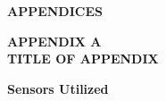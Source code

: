 \newpage


\begin{center}
    \vspace*{\fill}
    \large{\bf APPENDICES}
    \vspace*{\fill}
\end{center}

\newpage

\begin{center}
    \uppercase{\large{\bf APPENDIX A\\
    TITLE OF APPENDIX}}
\end{center}


\textbf{Sensors Utilized}

